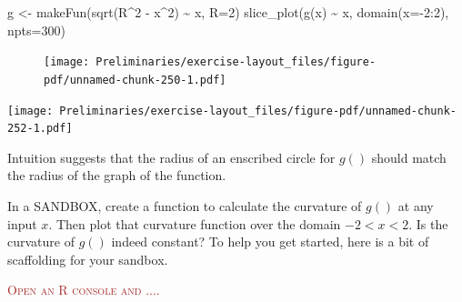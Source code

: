 \documentclass[
  letterpaper,
  DIV=11,
  numbers=noendperiod,
  oneside]{article}
\newenvironment{Shaded}{\begin{snugshade}}{\end{snugshade}}
\newcommand{\AttributeTok}[1]{\textcolor[rgb]{0.40,0.45,0.13}{#1}}
\newcommand{\DecValTok}[1]{\textcolor[rgb]{0.68,0.00,0.00}{#1}}
\newcommand{\FunctionTok}[1]{\textcolor[rgb]{0.28,0.35,0.67}{#1}}
\newcommand{\NormalTok}[1]{\textcolor[rgb]{0.00,0.23,0.31}{#1}}
\newcommand{\OtherTok}[1]{\textcolor[rgb]{0.00,0.23,0.31}{#1}}
\newcommand{\SpecialCharTok}[1]{\textcolor[rgb]{0.37,0.37,0.37}{#1}}
\newenvironment{scaffolding}%
{%
\textcolor{brown}{\hrulefill}%
  \par\vspace{.3\baselineskip}%
  \textcolor{brown}{\scshape Open an R console and ....}%
  \par\vspace{\baselineskip}%
}%
{\textcolor{brown}{\hrulefill}}
\begin{document}
\begin{multicols}{2}
\begin{Shaded}
\begin{Highlighting}[]
\NormalTok{g }\OtherTok{\textless{}{-}} \FunctionTok{makeFun}\NormalTok{(}\FunctionTok{sqrt}\NormalTok{(R}\SpecialCharTok{\^{}}\DecValTok{2} \SpecialCharTok{{-}}\NormalTok{ x}\SpecialCharTok{\^{}}\DecValTok{2}\NormalTok{) }\SpecialCharTok{\textasciitilde{}}\NormalTok{ x, }\AttributeTok{R=}\DecValTok{2}\NormalTok{)}
\FunctionTok{slice\_plot}\NormalTok{(}\FunctionTok{g}\NormalTok{(x) }\SpecialCharTok{\textasciitilde{}}\NormalTok{ x, }\FunctionTok{domain}\NormalTok{(}\AttributeTok{x=}\SpecialCharTok{{-}}\DecValTok{2}\SpecialCharTok{:}\DecValTok{2}\NormalTok{), }\AttributeTok{npts=}\DecValTok{300}\NormalTok{)}
\end{Highlighting}
\end{Shaded}

\begin{figure}[H]

{\centering \texttt{[image: Preliminaries/exercise-layout\_files/figure-pdf/unnamed-chunk-250-1.pdf]}

}

\end{figure}

\texttt{[image: Preliminaries/exercise-layout\_files/figure-pdf/unnamed-chunk-252-1.pdf]}

Intuition suggests that the radius of an enscribed circle for \(g()\)
should match the radius of the graph of the function.

In a SANDBOX, create a function to calculate the curvature of \(g()\) at
any input \(x\). Then plot that curvature function over the domain
\(-2 < x < 2\). Is the curvature of \(g()\) indeed constant? To help you
get started, here is a bit of scaffolding for your sandbox.

\begin{scaffolding}


\end{scaffolding}
\end{multicols}
\end{document}
